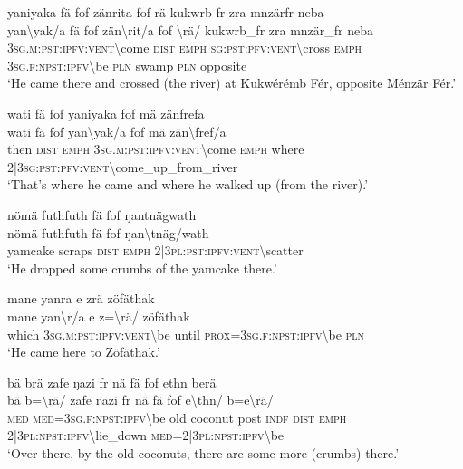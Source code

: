 \ea\label{ex:1:a3724}
yaniyaka fä fof zänrita fof rä kukwrb fr zra mnzärfr neba\\
\gll yan{\textbackslash}yak/a	fä	fof	zän{\textbackslash}rit/a	fof	{\textbackslash}rä/	kukwrb\_fr	zra	mnzär\_fr	neba\\
     3\textsc{sg}.\textsc{m}:\textsc{pst}:\textsc{ipfv}:\textsc{vent}{\textbackslash}come	\textsc{dist}	\textsc{emph}	\textsc{sg}:\textsc{pst}:\textsc{pfv}:\textsc{vent}{\textbackslash}cross	\textsc{emph}	3\textsc{sg}.\textsc{f}:\textsc{npst}:\textsc{ipfv}{\textbackslash}be	\textsc{pln}	swamp	\textsc{pln}	opposite\\
\glt `He came there and crossed (the river) at Kukwérémb Fér, opposite Ménzär Fér.'
\z

\ea\label{ex:1:a3728}
wati fä fof yaniyaka fof mä zänfrefa\\
\gll wati	fä	fof	yan{\textbackslash}yak/a	fof	mä	zän{\textbackslash}fref/a\\
     then	\textsc{dist}	\textsc{emph}	3\textsc{sg}.\textsc{m}:\textsc{pst}:\textsc{ipfv}:\textsc{vent}{\textbackslash}come	\textsc{emph}	where	2|3\textsc{sg}:\textsc{pst}:\textsc{pfv}:\textsc{vent}{\textbackslash}come\_up\_from\_river\\
\glt `That's where he came and where he walked up (from the river).'
\z

\ea\label{ex:1:a3731}
nömä futhfuth fä fof ŋantnägwath\\
\gll nömä	futhfuth	fä	fof	ŋan{\textbackslash}tnäg/wath\\
     yamcake	scraps	\textsc{dist}	\textsc{emph}	2|3\textsc{pl}:\textsc{pst}:\textsc{ipfv}:\textsc{vent}{\textbackslash}scatter\\
\glt `He dropped some crumbs of the yamcake there.'
\z

\ea\label{ex:1:a3734}
mane yanra e zrä zöfäthak\\
\gll mane	yan{\textbackslash}r/a	e	z={\textbackslash}rä/	zöfäthak\\
     which	3\textsc{sg}.\textsc{m}:\textsc{pst}:\textsc{ipfv}:\textsc{vent}{\textbackslash}be	until	\textsc{prox}=3\textsc{sg}.\textsc{f}:\textsc{npst}:\textsc{ipfv}{\textbackslash}be	\textsc{pln}\\
\glt `He came here to Zöfäthak.'
\z

\ea\label{ex:1:a3735}
bä brä zafe ŋazi fr nä fä fof ethn berä\\
\gll bä	b={\textbackslash}rä/	zafe	ŋazi	fr	nä	fä	fof	e{\textbackslash}thn/	b=e{\textbackslash}rä/\\
     \textsc{med}	\textsc{med}=3\textsc{sg}.\textsc{f}:\textsc{npst}:\textsc{ipfv}{\textbackslash}be	old	coconut	post	\textsc{indf}	\textsc{dist}	\textsc{emph}	2|3\textsc{pl}:\textsc{npst}:\textsc{ipfv}{\textbackslash}lie\_down	\textsc{med}=2|3\textsc{pl}:\textsc{npst}:\textsc{ipfv}{\textbackslash}be\\
\glt `Over there, by the old coconuts, there are some more (crumbs) there.'
\z

